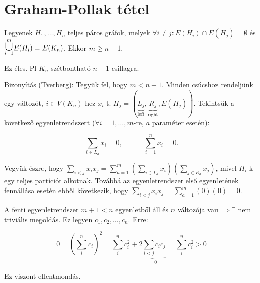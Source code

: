\chapter{Graham-Pollak tétel}

\begin{thm}
  Legyenek $H_1, \dots, H_n$ teljes páros gráfok, melyek $\forall i \not = j: E(H_i) \cap E(H_j) = \emptyset$ és $\cuploop{m}{i=1} E(H_i) = E(K_n)$. Ekkor $m \geq n - 1$.
\end{thm}

\begin{obs}
  Ez éles. Pl $K_n$ szétbontható $n-1$ csillagra.
\end{obs}

Bizonyítás (Tverberg):
Tegyük fel, hogy $m < n-1$. Minden csúcshoz rendeljünk egy változót, $i \in V(K_n)$-hez $x_i$-t. $H_j = (\underbrace{L_j}_{\text{left}}, \underbrace{R_j}_{\text{right}}, E(H_j))$. Tekintsük a következő egyenletrendszert ($\forall i=1, \dots , m$-re, $a$ paraméter esetén):

\[\sum_{i \in L_a} x_i = 0, \hspace{3em} \sum_{i = 1}^{n} x_i = 0. \]

Vegyük észre, hogy $\sum\limits_{i < j} x_i x_j = \sum\limits_{a=1}^m \left(\sum\limits_{i \in L_a} x_i\right) \left(\sum\limits_{j \in R_a} x_j\right)$, mivel $H_i$-k egy teljes partíciót alkotnak. Továbbá az egyenletrendszer első egyenletének fennállása esetén ebből következik, hogy $\sum_{i < j} x_i x_j = \sum_{a=1}^m (0) (0) = 0$.

\medskip

A fenti egyenletrendszer $m+1 < n$ egyenletből áll és $n$ változója van $\Rightarrow \exists$ nem triviális megoldás. Ez legyen $c_1, c_2, \dots, c_n$. Erre:

\[0 = \left(\sum_i^n c_i \right)^2 = \sum_i^n c_i^2 + \underbrace{2\sum_{i < j} c_i c_j}_{=0} = \sum_i^n c_i^2 > 0\]

Ez viszont ellentmondás. \QED

